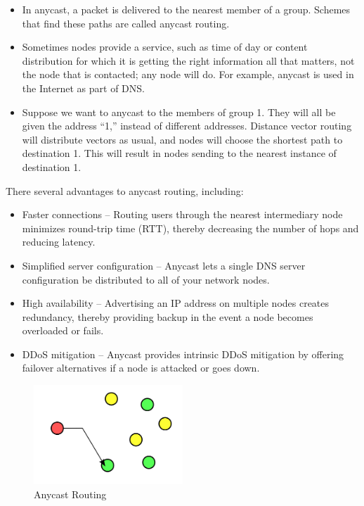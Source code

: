 \documentclass[twoside]{article}
\begin{document}
\newline \begin{itemize}
    \item In anycast, a packet is delivered to the nearest member of a group.
Schemes that find these paths are called anycast routing.
    \item Sometimes nodes provide a service, such as time of day or content
distribution for which it is getting the right information all that
matters, not the node that is contacted; any node will do. For
example, anycast is used in the Internet as part of DNS.
    \item Suppose we want to anycast to the members of group 1. They will all
be given the address “1,” instead of different addresses. Distance
vector routing will distribute vectors as usual, and nodes will choose
the shortest path to destination 1. This will result in nodes sending to
the nearest instance of destination 1.
\end{itemize}
\newline There several advantages to anycast routing, including:
\begin{itemize}
    \item Faster connections – Routing users through the nearest intermediary node minimizes round-trip time (RTT), thereby decreasing the number of hops and reducing latency.
    \item Simplified server configuration – Anycast lets a single DNS server configuration be distributed to all of your network nodes.
    \item High availability – Advertising an IP address on multiple nodes creates redundancy, thereby providing backup in the event a node becomes overloaded or fails.
    \item DDoS mitigation – Anycast provides intrinsic DDoS mitigation by offering failover alternatives if a node is attacked or goes down.
\end{itemize}
\begin{figure}
    \centering
    \includegraphics[width=0.5\textwidth]{images/ar.png}
    \caption{Anycast Routing}
\end{figure}
\newpage
\end{document}
